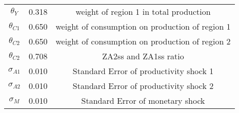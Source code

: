 \begin{center}
\begin{longtable}{ccc}
${\theta_{Y}}$ 	 & 	 0.318 	 & 	 weight of region 1 in total production\\
${\theta_{C1}}$ 	 & 	 0.650 	 & 	 weight of consumption on production of region 1\\
${\theta_{C2}}$ 	 & 	 0.650 	 & 	 weight of consumption on production of region 2\\
${\theta_{C2}}$ 	 & 	 0.708 	 & 	 ZA2ss and ZA1ss ratio\\
${\sigma_{A1}}$ 	 & 	 0.010 	 & 	 Standard Error of productivity shock 1\\
${\sigma_{A2}}$ 	 & 	 0.010 	 & 	 Standard Error of productivity shock 2\\
${\sigma_M}$ 	 & 	 0.010 	 & 	 Standard Error of monetary shock\\
\bottomrule%
\end{longtable}
\end{center}
